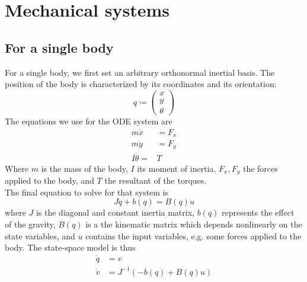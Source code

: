 \documentclass[12pt, openany]{report}
\theoremstyle{definition}
\begin{document}
\section{Mechanical systems}\label{sec:mechanical}
\subsection{For a single body}
For a single body, we first set an arbitrary orthonormal inertial basis. The position of the body is characterized by its coordinates and its orientation:
\begin{equation}
    q \coloneqq \begin{pmatrix}
        x\\y\\\theta
    \end{pmatrix}
\end{equation}
The equations we use for the ODE system are
\begin{align}
    m\ddot x &= F_x\\
    m\ddot y &= F_y\\
    I\ddot \theta = &T
\end{align}
Where $m$ is the mass of the body, $I$ its moment of inertia, $F_x,F_y$ the forces applied to the body, and $T$ the resultant of the torques. \\
The final equation to solve for that system is 
\begin{equation}
    J\ddot q+b(q) = B(q)u
\end{equation}
where $J$ is the diagonal and constant inertia matrix, $b(q)$ represents the effect of the gravity, $B(q)$ is a the kinematic matrix which depends nonlinearly on the state variables, and $u$ contains the input variables, e.g. some forces applied to the body. The state-space model is thus 
\begin{align}
    \dot q&= v \nonumber \\
    \dot v &= J^{-1}(-b(q)+B(q)u)
\end{align}
\end{document}
